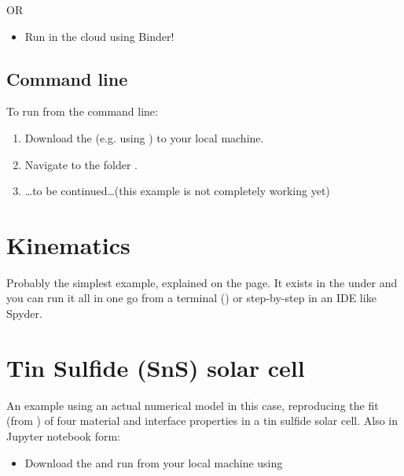 \documentclass[letterpaper,10pt,english]{sphinxmanual}
\begin{document}
OR
\begin{itemize}
\item {}
Run in the cloud using Binder! 

\end{itemize}


\subsection{Command line}
\label{\detokenize{examples:command-line}}
To run from the command line:
\begin{enumerate}
\item {}
Download the  (e.g. using ) to your local machine.

\item {}
Navigate to the folder .

\item {}
…to be continued…(this example is not completely working yet)

\end{enumerate}


\section{Kinematics}
\label{\detokenize{examples:kinematics}}
Probably the simplest example, explained on the {\hyperref[\detokenize{bayesics::doc}]{}} page. It exists in the  under  and you can run it all in one go from a terminal () or step-by-step in an IDE like Spyder.


\section{Tin Sulfide (SnS) solar cell}
\label{\detokenize{examples:tin-sulfide-sns-solar-cell}}\label{\detokenize{examples:sns}}
An example using an actual numerical model \textendash{} in this case, reproducing the fit (from ) of four material and interface properties in a tin sulfide solar cell. Also in Jupyter notebook form:
\begin{itemize}
\item {}
Download the  and run from your local machine using 

\end{itemize}
\end{document}
